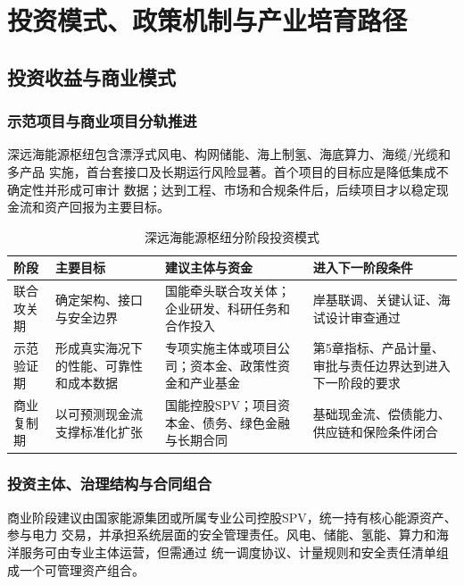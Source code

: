 \chapter{投资模式、政策机制与产业培育路径}


\section{投资收益与商业模式}

\subsection{示范项目与商业项目分轨推进}

深远海能源枢纽包含漂浮式风电、构网储能、海上制氢、海底算力、海缆/光缆和多产品
实施，首台套接口及长期运行风险显著。首个项目的目标应是降低集成不确定性并形成可审计
数据；达到工程、市场和合规条件后，后续项目才以稳定现金流和资产回报为主要目标。

\begin{table}[H]
\centering
\caption{深远海能源枢纽分阶段投资模式}
\label{tab:c6-investment-stages}
\begin{tabularx}{\textwidth}{p{2.4cm} X X X}
\toprule
阶段 & 主要目标 & 建议主体与资金 & 进入下一阶段条件\\
\midrule
联合攻关期 & 确定架构、接口与安全边界 & 国能牵头联合攻关体；企业研发、科研任务和合作投入 & 岸基联调、关键认证、海试设计审查通过\\
示范验证期 & 形成真实海况下的性能、可靠性和成本数据 & 专项实施主体或项目公司；资本金、政策性资金和产业基金 & 第5章指标、产品计量、审批与责任边界达到进入下一阶段的要求\\
商业复制期 & 以可预测现金流支撑标准化扩张 & 国能控股SPV；项目资本金、债务、绿色金融与长期合同 & 基础现金流、偿债能力、供应链和保险条件闭合\\
\bottomrule
\end{tabularx}
\end{table}

\subsection{投资主体、治理结构与合同组合}

商业阶段建议由国家能源集团或所属专业公司控股SPV，统一持有核心能源资产、参与电力
交易，并承担系统层面的安全管理责任。风电、储能、氢能、算力和海洋服务可由专业主体运营，但需通过
统一调度协议、计量规则和安全责任清单组成一个可管理资产组合。


